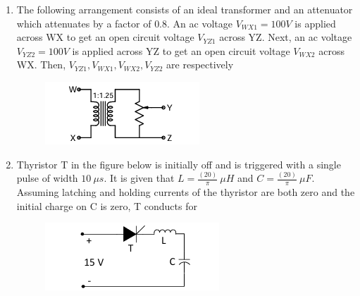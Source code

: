 \documentclass[journal,12pt,onecolumn]{IEEEtran}
\theoremstyle{remark}
\begin{document}
\begin{enumerate}
\begin{enumerate}
\end{enumerate}

\item The following arrangement consists of an ideal transformer and an attenuator which attenuates by a factor of $0.8$. An ac voltage $V_{WX1} = 100V$ is applied across WX to get an open circuit voltage $V_{YZ1}$ across YZ. Next, an ac voltage $V_{YZ2} = 100V$ is applied across YZ to get an open circuit voltage $V_{WX2}$ across WX. Then, $V_{YZ1}, V_{WX1}, V_{WX2}, V_{YZ2}$ are respectively
\begin{figure}[h]
    \centering
    \includegraphics[width=0.5\columnwidth]{figs/20.png}
    \label{fig:placeholder}
\end{figure}
\begin{enumerate}
\end{enumerate}


\item Thyristor T in the figure below is initially off and is triggered with a single pulse of width $10\ \mu s$. It is given that $L = \tfrac{(20)}{\pi}\ \mu H$ and $C = \tfrac{(20)}{\pi}\ \mu F$. Assuming latching and holding currents of the thyristor are both zero and the initial charge on C is zero, T conducts for
\begin{figure}[h!]
    \centering
    \includegraphics[width=0.5\columnwidth]{figs/21.png}
    \label{fig:placeholder}
\end{figure}
\begin{enumerate}
\begin{multicols}{4}
    


\end{multicols}
\end{enumerate}
\end{enumerate}
\end{document}
